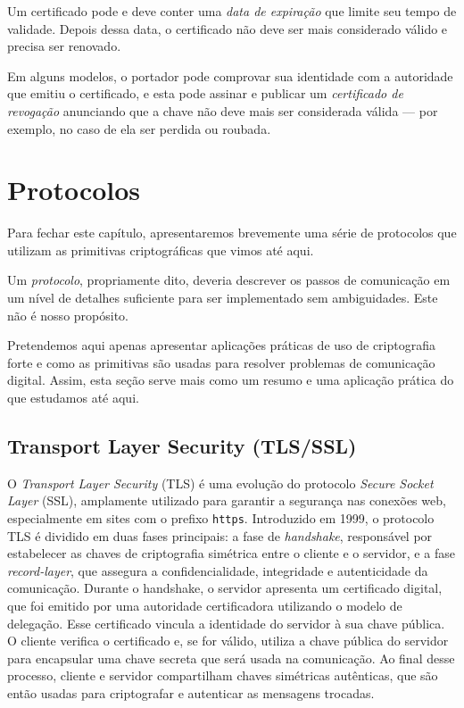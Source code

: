 Um certificado pode e deve conter uma {\em data de expiração} que limite seu tempo de validade.
Depois dessa data, o certificado não deve ser mais considerado válido e precisa ser renovado.

Em alguns modelos, o portador pode comprovar sua identidade com a autoridade que emitiu o certificado, e esta pode assinar e publicar um {\em certificado de revogação} anunciando que a chave não deve mais ser considerada válida — por exemplo, no caso de ela ser perdida ou roubada.

\section{Protocolos}
\label{sec:protocolos}

Para fechar este capítulo, apresentaremos brevemente uma série de protocolos que utilizam as primitivas criptográficas que vimos até aqui.

Um {\em protocolo}, propriamente dito, deveria descrever os passos de comunicação em um nível de detalhes suficiente para ser implementado sem ambiguidades.
Este não é nosso propósito.

Pretendemos aqui apenas apresentar aplicações práticas de uso de criptografia forte e como as primitivas são usadas para resolver problemas de comunicação digital.
Assim, esta seção serve mais como um resumo e uma aplicação prática do que estudamos até aqui.

\subsection{Transport Layer Security (TLS/SSL)}

O {\em Transport Layer Security} (TLS) é uma evolução do protocolo {\em Secure Socket Layer} (SSL), amplamente utilizado para garantir a segurança nas conexões web, especialmente em sites com o prefixo {\tt https}.
Introduzido em 1999, o protocolo TLS é dividido em duas fases principais:
a fase de {\em handshake}, responsável por estabelecer as chaves de criptografia simétrica entre o cliente e o servidor, e a fase {\em record-layer}, que assegura a confidencialidade, integridade e autenticidade da comunicação.
Durante o handshake, o servidor apresenta um certificado digital, que foi emitido por uma autoridade certificadora utilizando o modelo de delegação.
Esse certificado vincula a identidade do servidor à sua chave pública.
O cliente verifica o certificado e, se for válido, utiliza a chave pública do servidor para encapsular uma chave secreta que será usada na comunicação.
Ao final desse processo, cliente e servidor compartilham chaves simétricas autênticas, que são então usadas para criptografar e autenticar as mensagens trocadas.

